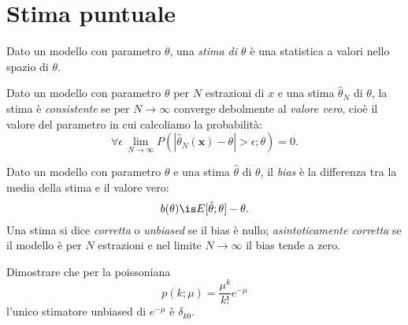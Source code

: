 
\section{Stima puntuale}

\begin{definition}[Stima]
	Dato un modello con parametro $\theta$,
	una \emph{stima di $\theta$} è una statistica a valori nello spazio di $\theta$.
\end{definition}

\begin{definition}[Consistenza]
	Dato un modello con parametro $\theta$ per $N$ estrazioni di $x$
	e una stima $\hat\theta_N$ di $\theta$,
	la stima è \emph{consistente}
	se per $N\to\infty$ converge debolmente al \emph{valore vero},
	cioè il valore del parametro in cui calcoliamo la probabilità:
	\begin{equation*}
		\forall\epsilon\, \lim_{N\to\infty} P(|\hat\theta_N(\mathbf x)-\theta| > \epsilon;\theta) = 0.
	\end{equation*}
\end{definition}

\begin{definition}[Bias]
	Dato un modello con parametro $\theta$ e una stima $\hat\theta$ di $\theta$,
	il \emph{bias} è la differenza tra la media della stima e il valore vero:
	\begin{equation*}
		b(\theta) \is E[\hat\theta;\theta] - \theta.
	\end{equation*}
	Una stima si dice \emph{corretta} o \emph{unbiased} se il bias è nullo;
	\emph{asintoticamente corretta} se il modello è per $N$ estrazioni
	e nel limite $N\to\infty$ il bias tende a zero.
\end{definition}


\begin{exercise}
    Dimostrare che per la poissoniana
    \begin{equation*}
        p(k;\mu) = \frac{\mu^k}{k!}e^{-\mu}
    \end{equation*}
    l'unico stimatore unbiased di $e^{-\mu}$ è $\delta_{k0}$.
\end{exercise}


